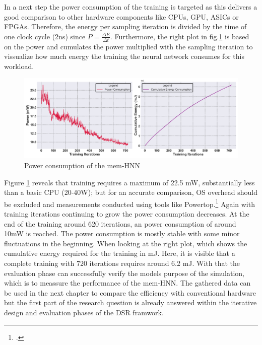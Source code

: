 In a next step the power consumption of the training is targeted as this delivers a good comparison to other
hardware components like \ac{CPU}s, \ac{GPU}, \ac{ASIC}s or \ac{FPGA}s.
Therefore, the energy per sampling iteration is divided by the time of one clock cycle (2ns) since \(P = \frac{\Delta E}{\Delta t}\).
Furthermore, the right plot in fig.\ref{Power consumption} is based on the power and cumulates the power multiplied with the sampling iteration to vissualize how much energy the training the neural network consumes for this workload.
\begin{figure}[H]
    \centering
    \includegraphics[width=0.9\linewidth]{graphics/energy_consumption_cumulative_plot.png}
    \caption{Power consumption of the \ac{mem-HNN}}
    \label{Power consumption}
\end{figure}
Figure \ref{Power consumption} reveals that training requires a maximum of 22.5 mW, substantially less than a basic CPU (20-40W); but for an accurate comparison, OS overhead should be excluded and measurements conducted using tools like Powertop.\footcite[cf.][1]{PowertopArchWiki} 
Again with training iterations continuing to grow the power consumption decreases. 
At the end of the training around 620 iterations, an power consumption of around 10mW is reached. 
The power consumption is mostly stable with some minor fluctuations in the beginning.
When looking at the right plot, which shows the cumulative energy required for the training in mJ.
Here, it is visible that a complete training with 720 iterations requires around 6.2 mJ. 
With that the evaluation phase can successfully verify the models purpose of the simulation, which is to meassure the performance of the \ac{mem-HNN}.
The gathered data can be used in the next chapter to compare the efficiency with conventional hardware but the
first part of the research question is already answered within the iterative design and evaluation phases of the \ac{DSR} framwork.
